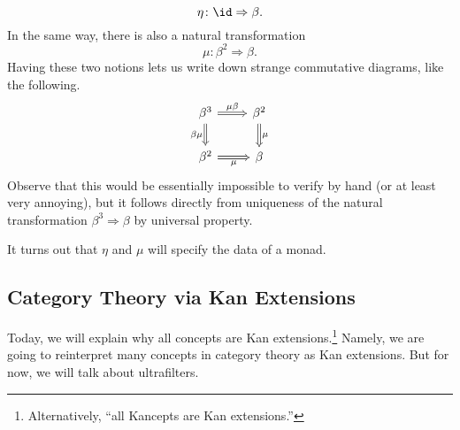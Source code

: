 \[\eta\colon\id\Rightarrow\beta.\]
In the same way, there is also a natural transformation
\[\mu\colon\beta^2\Rightarrow\beta.\]
Having these two notions lets us write down strange commutative diagrams, like the following.
\[\begin{tikzcd}
	{\beta^3} & {\beta^2} \\
	{\beta^2} & \beta
	\arrow["\mu\beta", Rightarrow, from=1-1, to=1-2]
	\arrow["\mu", Rightarrow, from=1-2, to=2-2]
	\arrow["\mu"', Rightarrow, from=2-1, to=2-2]
	\arrow["\beta\mu"', Rightarrow, from=1-1, to=2-1]
\end{tikzcd}\]
Observe that this would be essentially impossible to verify by hand (or at least very annoying), but it follows directly from uniqueness of the natural transformation $\beta^3\Rightarrow\beta$ by universal property.
\begin{remark}
	It turns out that $\eta$ and $\mu$ will specify the data of a monad.
\end{remark}

\subsection{Category Theory via Kan Extensions}
Today, we will explain why all concepts are Kan extensions.\footnote{Alternatively, ``all Kancepts are Kan extensions.''} Namely, we are going to reinterpret many concepts in category theory as Kan extensions. But for now, we will talk about ultrafilters.

